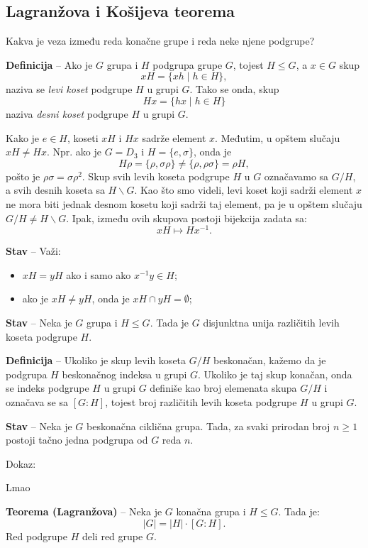 \documentclass[a4paper,12pt]{article}
\newcommand{\f}[1]{\(#1\)}
\begin{document}
\subsection{Lagranžova i Košijeva teorema}
Kakva je veza između reda konačne grupe i reda neke njene podgrupe?

\textbf{Definicija} -- Ako je \f{G} grupa i \f{H} podgrupa grupe \f{G}, tojest \f{H \leq G}, a \f{x \in G} skup
\[
xH = \{ xh \mid h \in H \},
\]
naziva se \emph{levi koset} podgrupe \f{H} u grupi \f{G}. Tako se onda, skup 
\[
Hx = \{ hx \mid h \in H \}
\]
naziva \emph{desni koset} podgrupe \f{H} u grupi \f{G}.

Kako je $e \in H$, koseti $xH$ i $Hx$ sadrže element $x$. Međutim, u opštem
slučaju $xH \neq Hx$. Npr. ako je $G = D_3$ i $H = \{e,\sigma\}$, onda je
\[
H\rho = \{\rho,\sigma\rho\} \neq \{\rho,\rho\sigma\} = \rho H,
\]
pošto je $\rho\sigma = \sigma\rho^2$.
Skup svih levih koseta podgrupe $H$ u $G$ označavamo sa $G/H$, a svih desnih
koseta sa $H\backslash G$. Kao što smo videli, levi koset koji sadrži
element $x$ ne mora biti jednak desnom kosetu koji sadrži taj element,
pa je u opštem slučaju $G/H \neq H\backslash G$. Ipak, između ovih skupova
postoji bijekcija zadata sa:
\[
xH \mapsto Hx^{-1}.
\]


\textbf{Stav} -- Važi:
\begin{itemize}
  \item \f{xH = yH} ako i samo ako \f{x^{-1}y \in H};
  \item ako je \f{xH \neq yH}, onda je \f{xH \cap yH = \emptyset};
\end{itemize}

\textbf{Stav} -- Neka je \f{G} grupa i \f{H \leq G}. Tada je \f{G} disjunktna unija različitih levih koseta podgrupe \f{H}.

\textbf{Definicija} -- Ukoliko je skup levih koseta \f{G/H} beskonačan, kažemo da je podgrupa \f{H} beskonačnog 
indeksa u grupi \f{G}. Ukoliko je taj skup konačan, onda se indeks podgrupe \f{H} u grupi \f{G} definiše kao broj 
elemenata skupa \f{G/H} i označava se sa \f{[G : H]}, tojest broj različitih levih koseta podgrupe \f{H} 
u grupi \f{G}.

\textbf{Stav} -- Neka je \f{G} beskonačna ciklična grupa. Tada, za svaki prirodan broj \f{n \geq 1} postoji tačno jedna podgrupa od \f{G} reda \f{n}.

Dokaz:

Lmao

\bigskip
\textbf{Teorema (Lagranžova)} -- Neka je \f{G} konačna grupa i \f{H \leq G}. Tada je:
\[
|G| = |H| \cdot [G : H].
\]
Red podgrupe \f{H} deli red grupe \f{G}.
\end{document}
